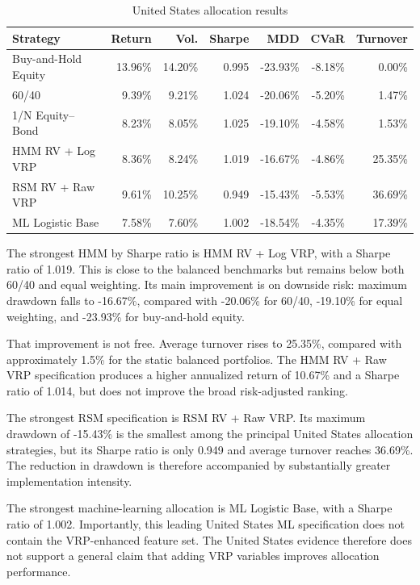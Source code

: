 \begin{table}[htbp]
\centering
\small
\caption{United States allocation results}
\label{tab:us_allocation}
\begin{tabularx}{\textwidth}{Xrrrrrr}
\toprule
Strategy
& Return
& Vol.
& Sharpe
& MDD
& CVaR
& Turnover \\
\midrule
Buy-and-Hold Equity
& 13.96\%
& 14.20\%
& 0.995
& -23.93\%
& -8.18\%
& 0.00\% \\
60/40
& 9.39\%
& 9.21\%
& 1.024
& -20.06\%
& -5.20\%
& 1.47\% \\
1/N Equity--Bond
& 8.23\%
& 8.05\%
& 1.025
& -19.10\%
& -4.58\%
& 1.53\% \\
HMM RV + Log VRP
& 8.36\%
& 8.24\%
& 1.019
& -16.67\%
& -4.86\%
& 25.35\% \\
RSM RV + Raw VRP
& 9.61\%
& 10.25\%
& 0.949
& -15.43\%
& -5.53\%
& 36.69\% \\
ML Logistic Base
& 7.58\%
& 7.60\%
& 1.002
& -18.54\%
& -4.35\%
& 17.39\% \\
\bottomrule
\end{tabularx}
\end{table}

The strongest HMM by Sharpe ratio is HMM RV + Log VRP, with a Sharpe ratio of 1.019. This is close to the balanced benchmarks but remains below both 60/40 and equal weighting. Its main improvement is on downside risk: maximum drawdown falls to -16.67\%, compared with -20.06\% for 60/40, -19.10\% for equal weighting, and -23.93\% for buy-and-hold equity.

That improvement is not free. Average turnover rises to 25.35\%, compared with approximately 1.5\% for the static balanced portfolios. The HMM RV + Raw VRP specification produces a higher annualized return of 10.67\% and a Sharpe ratio of 1.014, but does not improve the broad risk-adjusted ranking.

The strongest RSM specification is RSM RV + Raw VRP. Its maximum drawdown of -15.43\% is the smallest among the principal United States allocation strategies, but its Sharpe ratio is only 0.949 and average turnover reaches 36.69\%. The reduction in drawdown is therefore accompanied by substantially greater implementation intensity.

The strongest machine-learning allocation is ML Logistic Base, with a Sharpe ratio of 1.002. Importantly, this leading United States ML specification does not contain the VRP-enhanced feature set. The United States evidence therefore does not support a general claim that adding VRP variables improves allocation performance.

